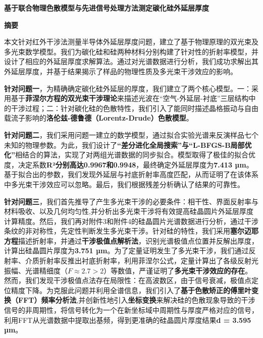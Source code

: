 \documentclass[a4paper]{ctexart}
\begin{document}
\begin{center}
    \vspace*{0.2cm} %
    {\Large\bfseries 基于联合物理色散模型与先进信号处理方法测定碳化硅外延层厚度} %
    \vspace*{1cm}
    
    {\Large\bfseries 摘\quad 要}
\end{center}

\thispagestyle{fancy} %


本文针对红外干涉法测量半导体外延层厚度问题，建立了基于物理原理的双光束及多光束数学模型。我们为碳化硅和硅两种材料分别构建了针对性的折射率模型，并设计了相应的外延层厚度求解算法。通过对光谱数据进行分析，我们成功求解出其外延层厚度，并基于结果揭示了样品的物理性质及多光束干涉效应的影响。

\noindent \textbf{针对问题一}，为精确确定碳化硅外延层的厚度，我们建立了两个核心模型。一：采用基于\textbf{菲涅尔方程的双光束干涉理论}来描述光波在“空气-外延层-衬底”三层结构中的干涉过程；二：针对碳化硅的色散特性，我们引入了能同时描述晶格振动与自由载流子影响的\textbf{洛伦兹-德鲁德（Lorentz-Drude）色散模型}。

\noindent \textbf{针对问题二}，我们采用问题一建立的数学模型，通过拟合实验光谱来反演样品七个未知的物理参数。为此，我们设计了\textbf{“差分进化全局搜索”与“L-BFGS-B局部优化”}相结合的算法，实现了对两组光谱数据的同步拟合。模型取得了极佳的拟合优度，决定系数\textbf{R²分别高达0.9967和0.9948}，最终确定外延层厚度为\textbf{7.413 µm}。基于拟合出的参数，我们发现外延层与衬底折射率高度匹配，从而证明了在该体系中多光束干涉效应可以忽略。最后，我们根据残差分析确认了结果的可靠性。

\noindent \textbf{针对问题三}，我们首先推导了产生多光束干涉的必要条件：相干性、界面反射率与材料吸收、以及几何均匀性,并分析出多光束干涉将有效提高硅晶圆片外延层厚度计算精度。然后，我们再对附件3和附件4的硅晶圆片光谱数据进行分析，通过干涉条纹的非对称性，先定性判断发生多光束干涉。针对硅的特性，我们采用\textbf{塞尔迈耶方程}描述折射率，并通过\textbf{干涉极值点解析法}，识别光谱极值点位置并反解出厚度，计算出硅晶圆片厚度为\textbf{3.751 µm}。为了定量证明发生了多光束干涉，我们通过反射率、介质折射率反推出衬底折射率，利用菲涅尔公式，定量计算出了各级反射光振幅、光谱精细度（$F\approx 2.7>2$）等数值，严谨证明了\textbf{多光束干涉效应的存在}。然而，我们发现干涉极值点法存在局限性：在高波数区，由于信号衰减，极值点定位精度下降。为克服此问题并利用全谱信息，我们引入了\textbf{基于色散矫正的傅里叶变换（FFT）频率分析法},并创新性地引入\textbf{坐标变换}来解决硅的色散现象导致的干涉信号的非周期性，将信号转化为一个在新坐标域中周期性与厚度严格对应的信号，利用FFT从光谱数据中提取出基频，得到更准确的硅晶圆片厚度结果\textbf{d = 3.595 µm}。
\end{document}

